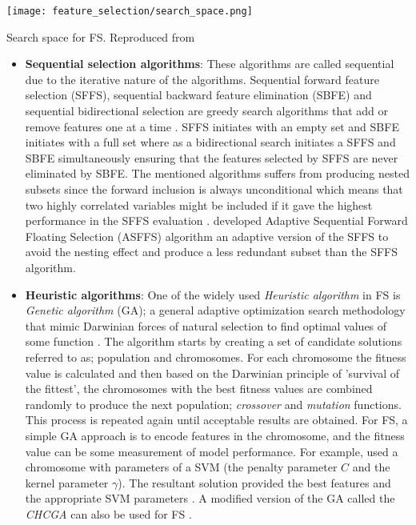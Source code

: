 \begin{marginfigure}
  \texttt{[image: feature\_selection/search\_space.png]}
  \caption{Search space for FS. Reproduced from \citet{liu2012feature}}
  \label{fig:fs_search_space}
\end{marginfigure}

\begin{itemize}
  \item\textbf{Sequential selection algorithms}: These algorithms are called sequential due to the iterative nature of the algorithms. Sequential forward feature selection (SFFS), sequential backward feature elimination (SBFE) and sequential bidirectional selection are greedy search algorithms that add or remove features one at a time \citep{liu2005toward}. SFFS initiates with an empty set and SBFE initiates with a full set where as a bidirectional search initiates a SFFS and SBFE simultaneously ensuring that the features selected by SFFS are never eliminated by SBFE. The mentioned algorithms suffers from producing nested subsets since the forward inclusion is always unconditional which means that two highly correlated variables might be included if it gave the highest performance in the SFFS evaluation \citep{chandrashekar2014survey}. \citet{sun2006comparison} developed Adaptive Sequential Forward Floating Selection (ASFFS) algorithm an adaptive version of the SFFS to avoid the nesting effect and produce a less redundant subset than the SFFS algorithm.
  \item\textbf{Heuristic algorithms}: One of the widely used \textit{Heuristic algorithm} in FS is \textit{Genetic algorithm} (GA); a general adaptive optimization search methodology that mimic Darwinian forces of natural selection to find optimal values of some function \citep{chandrashekar2014survey}. The algorithm starts by creating a set of candidate solutions referred to as; population and chromosomes. For each chromosome the fitness value is calculated and then based on the Darwinian principle of 'survival of the fittest', the chromosomes with the best fitness values are combined randomly to produce the next population; \textit{crossover} and \textit{mutation} functions. This process is repeated again until acceptable results are obtained. For FS, a simple GA approach is to encode features in the chromosome, and the fitness value can be some measurement of model performance. For example, \citet{huang2006ga} used a chromosome with parameters of a SVM (the penalty parameter $C$ and the kernel parameter $\gamma$). The resultant solution provided the best features and the appropriate SVM parameters \citep{de2015grammar}. A modified version of the GA called the \textit{CHCGA} can also be used for FS \citep{chandrashekar2014survey}.
\end{itemize}

